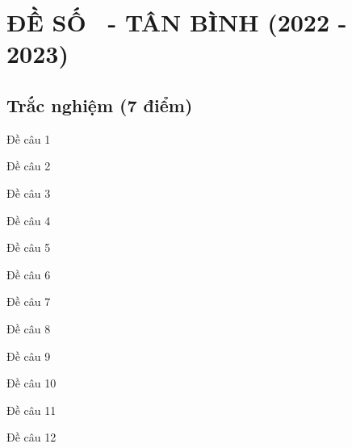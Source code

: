 \section{ĐỀ SỐ \thesection \ - TÂN BÌNH (2022 - 2023)}

\setcounter{ex}{0}
\subsection{Trắc nghiệm (7 điểm)}
\begin{ex}
	Đề câu 1
	\choice
	{\True }
	{}
	{}
	{}	
\end{ex}


\begin{ex}
	Đề câu 2
	\choice
	{\True }
	{}
	{}
	{}	
\end{ex}


\begin{ex}
	Đề câu 3
	\choice
	{\True }
	{}
	{}
	{}	
\end{ex}


\begin{ex}
	Đề câu 4
	\choice
	{\True }
	{}
	{}
	{}	
\end{ex}


\begin{ex}
	Đề câu 5
	\choice
	{\True }
	{}
	{}
	{}	
\end{ex}


\begin{ex}
	Đề câu 6
	\choice
	{\True }
	{}
	{}
	{}	
\end{ex}


\begin{ex}
	Đề câu 7
	\choice
	{\True }
	{}
	{}
	{}	
\end{ex}


\begin{ex}
	Đề câu 8
	\choice
	{\True }
	{}
	{}
	{}	
\end{ex}


\begin{ex}
	Đề câu 9
	\choice
	{\True }
	{}
	{}
	{}	
\end{ex}


\begin{ex}
	Đề câu 10
	\choice
	{\True }
	{}
	{}
	{}	
\end{ex}


\begin{ex}
	Đề câu 11
	\choice
	{\True }
	{}
	{}
	{}	
\end{ex}


\begin{ex}
	Đề câu 12
	\choice
	{\True }
	{}
	{}
	{}	
\end{ex}


